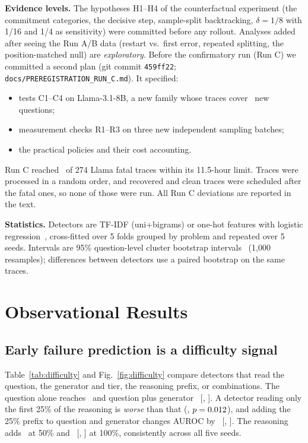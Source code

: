 \documentclass[10pt,twocolumn]{article}
\begin{document}
\textbf{Evidence levels.}\label{sec:evidence} The hypotheses H1--H4 of the counterfactual
experiment (the commitment categories, the decisive step, sample-split backtracking, $\delta=1/8$ with
1/16 and 1/4 as sensitivity) were committed before any rollout. Analyses added after seeing the
Run A/B data (restart vs.\ first error, repeated splitting, the position-matched null) are
\emph{exploratory}. Before the confirmatory run (Run C) we committed a second plan (git commit
\texttt{459ff22}; \texttt{docs/PREREGISTRATION\_RUN\_C.md}). It specified:
\begin{itemize}
\item tests C1--C4 on Llama-3.1-8B, a new family whose traces cover \QuestionsLlamaNew\ new questions;
\item measurement checks R1--R3 on three new independent sampling batches;
\item the practical policies and their cost accounting.
\end{itemize}
Run C reached \LlamaN\ of 274 Llama fatal traces within its 11.5-hour limit. Traces were processed
in a random order, and recovered and clean traces were scheduled after the fatal ones, so none
of those were run. All Run C deviations are reported in the text.

\textbf{Statistics.} Detectors are TF-IDF (uni+bigrams) or one-hot features with logistic
regression~\cite{tfidf}, cross-fitted over 5 folds grouped by problem and repeated over 5 seeds.
Intervals are 95\% question-level cluster bootstrap intervals~\cite{field2007} (1,000 resamples);
differences between detectors use a paired bootstrap on the same traces.

\section{Observational Results}\label{sec:obs}
\subsection{Early failure prediction is a difficulty signal}
Table~\ref{tab:difficulty} and Fig.~\ref{fig:difficulty} compare detectors that read the question,
the generator and tier, the reasoning prefix, or combinations. The question alone reaches
\aucQ\ and question plus generator \aucQG\ [\aucQGLo, \aucQGHi]. A detector reading only the first
25\% of the reasoning is \emph{worse} than that (\dPAvsQG, $p=0.012$), and adding the 25\% prefix
to question and generator changes AUROC by \dIncA\ [\dIncALo, \dIncAHi]. The reasoning adds
\dIncB\ at 50\% and \dIncC\ [\dIncCLo, \dIncCHi] at 100\%, consistently across all five seeds.
\end{document}
